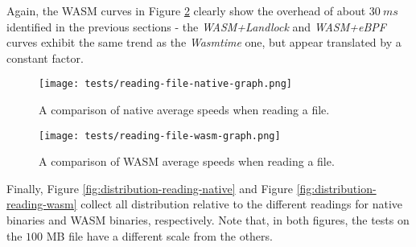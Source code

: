 Again, the WASM curves in Figure \ref{fig:avg-comparison-wasm-speed} clearly show the overhead
of about $30\ ms$ identified in the previous sections - the \textit{WASM+Landlock} and \textit{WASM+eBPF} curves
exhibit the same trend as the \textit{Wasmtime} one, but appear translated by a constant factor.

\begin{figure}[ht!]
  \centering
  \texttt{[image: tests/reading-file-native-graph.png]}
  \caption{A comparison of native average speeds when reading a file.}
  \label{fig:avg-comparison-native-speed}
\end{figure}

\begin{figure}[ht!]
  \centering
  \texttt{[image: tests/reading-file-wasm-graph.png]}
  \caption{A comparison of WASM average speeds when reading a file.}
  \label{fig:avg-comparison-wasm-speed}
\end{figure}

\clearpage
Finally, Figure \ref{fig:distribution-reading-native} and Figure \ref{fig:distribution-reading-wasm}
collect all distribution relative to the different readings for native binaries and WASM binaries, respectively.
Note that, in both figures, the tests on the $100$ MB file have a different scale from the others.

